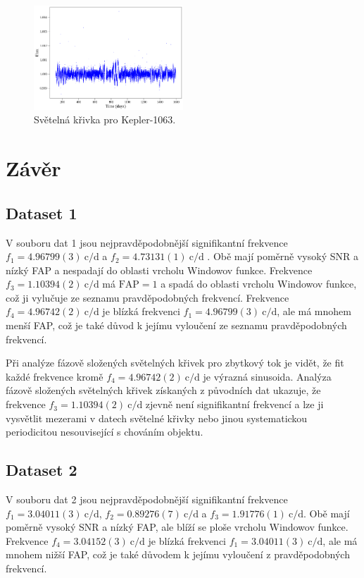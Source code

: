 \documentclass[a4paper,11pt,twocolumn]{article}
\begin{document}
            \begin{figure}
                \centering
                \includegraphics[width=0.5\textwidth]{lc/Kepler-1063_lc.png}
                \caption{Světelná křivka pro Kepler-1063.}
                \label{fig:kplr_ls}
            \end{figure}

    \section{Závěr}
        \subsection{Dataset 1}
            V souboru dat 1 jsou nejpravděpodobnější signifikantní frekvence $f_1 = 4.96799(3) ~\text{c/d}$ a $f_2 = 4.73131(1) ~\text{c/d}$ . Obě mají poměrně vysoký SNR a nízký FAP a nespadají do oblasti vrcholu Windowov funkce. Frekvence $f_3 = 1.10394(2) ~\text{c/d}$ má $\text{FAP} = 1$ a spadá do oblasti vrcholu Windowov funkce, což ji vylučuje ze seznamu pravděpodobných frekvencí. Frekvence $f_4 = 4.96742(2) ~\text{c/d}$ je blízká frekvenci $f_1 = 4.96799(3) ~\text{c/d}$, ale má mnohem menší FAP, což je také důvod k jejímu vyloučení ze seznamu pravděpodobných frekvencí.

            Při analýze fázově složených světelných křivek pro zbytkový tok je vidět, že fit každé frekvence kromě $f_4 = 4.96742(2) ~\text{c/d}$ je výrazná sinusoida. Analýza fázově složených světelných křivek získaných z původních dat ukazuje, že frekvence $f_3 = 1.10394(2) ~\text{c/d}$ zjevně není signifikantní frekvencí a lze ji vysvětlit mezerami v datech světelné křivky nebo jinou systematickou periodicitou nesouvisející s chováním objektu.

        \subsection{Dataset 2}
            V souboru dat 2 jsou nejpravděpodobnější signifikantní frekvence $f_1 = 3.04011(3) ~\text{c/d}$, $f_2 = 0.89276(7) ~\text{c/d}$ a $f_3 = 1.91776(1) ~\text{c/d}$. Obě mají poměrně vysoký SNR a nízký FAP, ale blíží se ploše vrcholu Windowov funkce. Frekvence $f_4 = 3.04152(3) ~\text{c/d}$ je blízká frekvenci $f_1 = 3.04011(3) ~\text{c/d}$, ale má mnohem nižší FAP, což je také důvodem k jejímu vyloučení z pravděpodobných frekvencí. 
            
\end{document}
